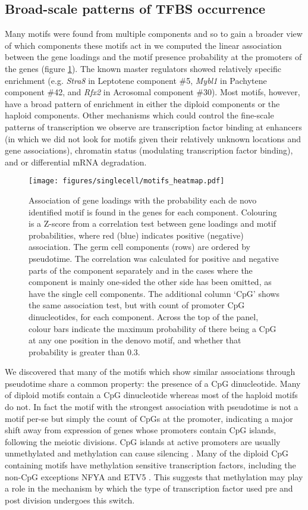 \subsection{Broad-scale patterns of TFBS occurrence}
Many motifs were found from multiple components and so to gain a broader view of which components these motifs act in we computed the linear association between the gene loadings and the motif presence probability at the promoters of the genes (figure \ref{fig:motifs_heatmap}). The known master regulators showed relatively specific enrichment (e.g. \textit{Stra8} in Leptotene component \#5, \textit{Mybl1} in Pachytene component \#42, and \textit{Rfx2} in Acrosomal component \#30). Most motifs, however, have a broad pattern of enrichment in either the diploid components or the haploid components. Other mechanisms which could control the fine-scale patterns of transcription we observe are transcription factor binding at enhancers (in which we did not look for motifs given their relatively unknown locations and gene associations), chromatin status (modulating transcription factor binding), and or differential mRNA degradation.

\begin{figure}[H]
	\centering
	\texttt{[image: figures/singlecell/motifs\_heatmap.pdf]}
	\caption[Motifs Heatmap]{
		Association of gene loadings with the probability each de novo identified motif is found in the genes for each component. Colouring is a Z-score from a correlation test between gene loadings and motif probabilities, where red (blue) indicates positive (negative) association. The germ cell components (rows) are ordered by pseudotime. The correlation was calculated for positive and negative parts of the component separately and in the cases where the component is mainly one-sided the other side has been omitted, as have the single cell components. The additional column ‘CpG’ shows the same association test, but with count of promoter CpG dinucleotides, for each component. Across the top of the panel, colour bars indicate the maximum probability of there being a CpG at any one position in the denovo motif, and whether that probability is greater than 0.3.
	}
	\label{fig:motifs_heatmap}
\end{figure}

We discovered that many of the motifs which show similar associations through pseudotime share a common property: the presence of a CpG dinucleotide. Many of diploid motifs contain a CpG dinucleotide whereas most of the haploid motifs do not. In fact the motif with the strongest association with pseudotime is not a motif per-se but simply the count of CpGs at the promoter, indicating a major shift away from expression of genes whose promoters contain CpG islands, following the meiotic divisions. CpG islands at active promoters are usually unmethylated and methylation can cause silencing \parencite{Li2014DNA}. Many of the diploid CpG containing motifs have methylation sensitive transcription factors, including the non-CpG exceptions NFYA and ETV5 \parencite{Domcke2015Competition, Wang2017NRF1}. This suggests that methylation may play a role in the mechanism by which the type of transcription factor used pre and post division undergoes this switch.

